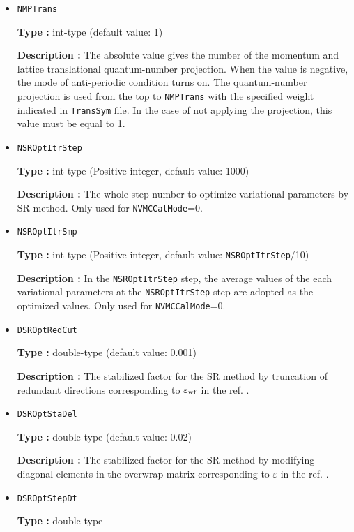 \begin{itemize}
{\bf Description :}   The spin quantum-number. 

 \item  \verb|NMPTrans|

{\bf Type :} int-type (default value: 1)

{\bf Description :} 
The absolute value gives the number of the momentum and lattice translational quantum-number projection. When the value is negative, the mode of anti-periodic condition turns on. The quantum-number projection is used from the top to \verb|NMPTrans| with the specified weight indicated in \verb|TransSym| file. In the case of not applying the projection, this value must be equal to 1.

 \item  \verb|NSROptItrStep|

{\bf Type :} int-type (Positive integer, default value: 1000)

{\bf Description :} 
The whole step number to optimize variational parameters by SR method. Only used for \verb|NVMCCalMode|=0.
 
 \item  \verb|NSROptItrSmp|

{\bf Type :} int-type (Positive integer, default value: \verb|NSROptItrStep|/10)

{\bf Description :} In the \verb|NSROptItrStep| step, the average values of the each variational parameters at the \verb|NSROptItrStep| step are adopted as the optimized values. Only used for \verb|NVMCCalMode|=0.

\item   \verb|DSROptRedCut|
   
{\bf Type :} double-type (default value: 0.001)

{\bf Description :} The stabilized factor for the SR method by truncation of redundant directions corresponding to $\varepsilon_{\rm wf}$ in the ref. \cite{Tahara2008}.

 \item  \verb|DSROptStaDel| 
   
 {\bf Type :} double-type (default value: 0.02)

  {\bf Description :} The stabilized factor for the SR method by modifying diagonal elements in the overwrap matrix corresponding to $\varepsilon$ in the ref. \cite{Tahara2008}.
     
\item \verb|DSROptStepDt|

{\bf Type :} double-type 


\end{itemize}

